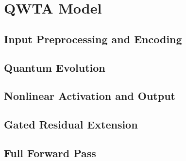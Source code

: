 \section{QWTA Model}
\label{sec:model}

\subsection{Input Preprocessing and Encoding}

\subsection{Quantum Evolution}

\subsection{Nonlinear Activation and Output}

\subsection{Gated Residual Extension}

\subsection{Full Forward Pass}
